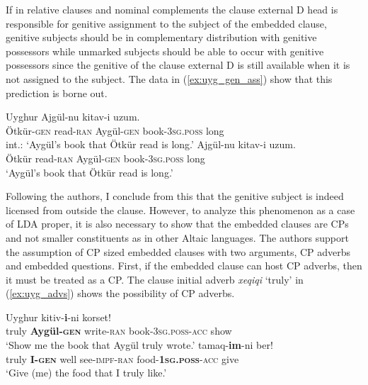 \documentclass[output=paper
,modfonts
,nonflat]{langsci/langscibook}
\begin{document}
If in relative clauses and nominal complements the clause external D head is responsible for genitive assignment to the subject of the embedded clause, genitive subjects should be in complementary distribution with genitive possessors while unmarked subjects should be able to occur with genitive possessors since the genitive of the clause external D is still available when it is not assigned to the subject. The data in (\ref{ex:uyg_gen_ass}) show that this prediction is borne out.
\begin{exe}
\ex Uyghur \citep[][3]{Asarina_Hartman2011a} \label{ex:uyg_gen_ass}
	\xlist
	\ex 
		 Ajgül-nu kitav-i uzum.\\
			 Ötkür-\textsc{gen} read-\textsc{ran} Aygül-\textsc{gen} book-3\textsc{sg.poss} long\\
		\glt int.: `Aygül's book that Ötkür read is long.'
	\ex
		 Ajgül-nu kitav-i uzum.\\
			 Ötkür read-\textsc{ran} Aygül-\textsc{gen} book-3\textsc{sg.poss} long\\
		\glt `Aygül's book that Ötkür read is long.'
	\endxlist
\end{exe}
Following the authors, I conclude from this that the genitive subject is indeed licensed from outside the clause. However, to analyze this phenomenon as a case of LDA proper, it is also necessary to show that the embedded clauses are CPs and not smaller constituents as in other Altaic languages. The authors support the assumption of CP sized embedded clauses with two arguments, CP adverbs and embedded questions. First, if the embedded clause can host CP adverbs, then it must be treated as a CP. The clause initial adverb \textit{xeqiqi} `truly' in (\ref{ex:uyg_advs}) shows the possibility of CP adverbs.
\begin{exe}
\ex Uyghur \citep[][8]{Asarina_Hartman2011a}\label{ex:uyg_advs}
	\xlist
	\ex 
		  kitiv-\textbf{i}-ni korset!\\
			 {} truly \textbf{Aygül-\textsc{gen}} write-\textsc{ran} {} book-\textsc{3sg.poss}-\textsc{acc} show\\
		\glt `Show me the book that Aygül truly wrote.'
	\ex
		 tamaq-\textbf{im}-ni ber!\\
			 {} truly \textbf{I-\textsc{gen}} well see-\textsc{impf}-\textsc{ran} {} food-\textbf{\textsc{1sg.poss}}-\textsc{acc} give\\
		\glt `Give (me) the food that I truly like.'
	\endxlist
\end{exe}
\end{document}
